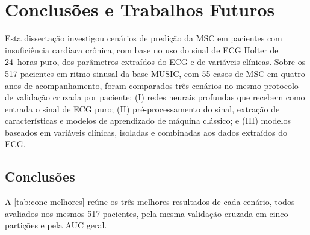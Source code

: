 
\chapter{Conclusões e Trabalhos Futuros}
\label{cap:conclusoes}

Esta dissertação investigou cenários de predição da \gls{MSC} em pacientes
com insuficiência cardíaca crônica, com base no uso do sinal de \gls{ECG}
Holter de 24~horas puro, dos parâmetros extraídos do \gls{ECG} e de
variáveis clínicas. Sobre os 517 pacientes em ritmo sinusal da base
\gls{MUSIC}, com 55 casos de \gls{MSC} em quatro anos de acompanhamento,
foram comparados três cenários no mesmo protocolo de validação cruzada por
paciente: (I) redes neurais profundas que recebem como entrada o sinal de
\gls{ECG} puro; (II) pré-processamento do sinal, extração de características
e modelos de aprendizado de máquina clássico; e (III) modelos baseados em
variáveis clínicas, isoladas e combinadas aos dados extraídos do \gls{ECG}.

\section{Conclusões}
\label{sec:conc-conclusoes}

A \autoref{tab:conc-melhores} reúne os três melhores resultados de cada
cenário, todos avaliados nos mesmos 517 pacientes, pela mesma validação
cruzada em cinco partições e pela \gls{AUC} geral.

